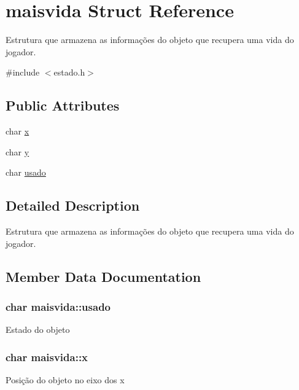 \hypertarget{structmaisvida}{}\section{maisvida Struct Reference}
\label{structmaisvida}


Estrutura que armazena as informações do objeto que recupera uma vida do jogador.  




{\ttfamily \#include $<$estado.\+h$>$}

\subsection*{Public Attributes}
\begin{DoxyCompactItemize}
\item 
char \hyperlink{structmaisvida_a05be51f939e8f935f81c1f168998ef33}{x}
\item 
char \hyperlink{structmaisvida_a59d8e5562b01360f5982c23dbbfa8c00}{y}
\item 
char \hyperlink{structmaisvida_ae75ce3c30cf8b310edc44cfb282c3f36}{usado}
\end{DoxyCompactItemize}


\subsection{Detailed Description}
Estrutura que armazena as informações do objeto que recupera uma vida do jogador. 

\subsection{Member Data Documentation}
\subsubsection[{\texorpdfstring{usado}{usado}}]{\setlength{\rightskip}{0pt plus 5cm}char maisvida\+::usado}\hypertarget{structmaisvida_ae75ce3c30cf8b310edc44cfb282c3f36}{}\label{structmaisvida_ae75ce3c30cf8b310edc44cfb282c3f36}
Estado do objeto 
\subsubsection[{\texorpdfstring{x}{x}}]{\setlength{\rightskip}{0pt plus 5cm}char maisvida\+::x}\hypertarget{structmaisvida_a05be51f939e8f935f81c1f168998ef33}{}\label{structmaisvida_a05be51f939e8f935f81c1f168998ef33}
Posição do objeto no eixo dos x 
